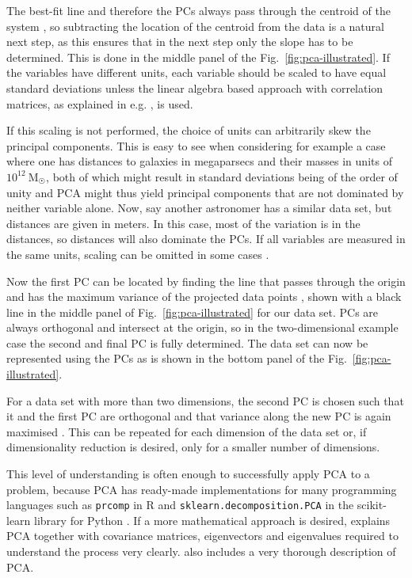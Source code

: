 \documentclass[english, twoside]{HYgradu}
\begin{document}
The best-fit line and therefore the PCs always pass through the centroid of the system \citep{pearson1901lines}, so subtracting the location of the centroid from the data is a natural next step, as this ensures that in the next step only the slope has to be determined. This is done in the middle panel of the Fig.\ \ref{fig:pca-illustrated}. If the variables have different units, each variable should be scaled to have equal standard deviations \citep{james2013introduction} unless the linear algebra based approach with correlation matrices, as explained in e.g. \citet{jolliffe2002principal}, is used.

If this scaling is not performed, the choice of units can arbitrarily skew the principal components. This is easy to see when considering for example a case where one has distances to galaxies in megaparsecs and their masses in units of $10^{12}\ \mathrm{M_{\astrosun}}$, both of which might result in standard deviations being of the order of unity and PCA might thus yield principal components that are not dominated by neither variable alone. Now, say another astronomer has a similar data set, but distances are given in meters. In this case, most of the variation is in the distances, so distances will also dominate the PCs. If all variables are measured in the same units, scaling can be omitted in some cases \citep{james2013introduction}.

Now the first PC can be located by finding the line that passes through the origin and has the maximum variance of the projected data points \citep{jolliffe2002principal}, shown with a black line in the middle panel of Fig.\ \ref{fig:pca-illustrated} for our data set. PCs are always orthogonal and intersect at the origin, so in the two-dimensional example case the second and final PC is fully determined. The data set can now be represented using the PCs as is shown in the bottom panel of the Fig.\ \ref{fig:pca-illustrated}.

For a data set with more than two dimensions, the second PC is chosen such that it and the first PC are orthogonal and that variance along the new PC is again maximised \citep{jolliffe2002principal}. This can be repeated for each dimension of the data set or, if dimensionality reduction is desired, only for a smaller number of dimensions.

This level of understanding is often enough to successfully apply PCA to a problem, because PCA has ready-made implementations for many programming languages such as \texttt{prcomp} in R \citep{james2013introduction} and \texttt{sklearn.decomposition.PCA} in the scikit-learn library  for Python \citep{scikit-learn}. If a more mathematical approach is desired, \citet{smith2002tutorial} explains PCA together with covariance matrices, eigenvectors and eigenvalues required to understand the process very clearly. \citet{jolliffe2002principal} also includes a very thorough description of PCA.
\end{document}
